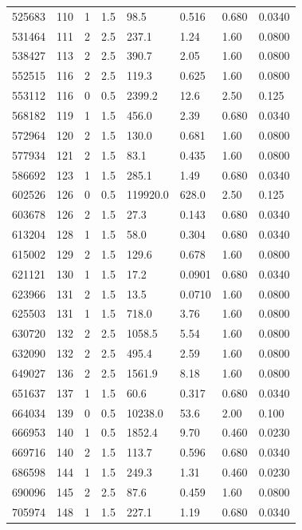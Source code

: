 \documentclass[preview]{standalone}
\begin{document}
{{{\begin{tabular}{L{1.2cm}C{1.2cm} C{0.3cm}C{0.5cm} C{1.4cm}C{1.4cm} C{1.4cm}C{1.4cm}}
  525683  &   110  & 1     & 1.5 &  98.5  & 0.516  & 0.680 &  0.0340   \\ 
  531464  &   111  & 2     & 2.5 &  237.1  & 1.24  & 1.60 &  0.0800   \\ 
  538427  &   113  & 2     & 2.5 &  390.7  & 2.05  & 1.60 &  0.0800   \\ 
  552515  &   116  & 2     & 2.5 &  119.3  & 0.625  & 1.60 &  0.0800   \\ 
  553112  &   116  & 0     & 0.5 &  2399.2  & 12.6  & 2.50 &  0.125   \\ 
  568182  &   119  & 1     & 1.5 &  456.0  & 2.39  & 0.680 &  0.0340   \\ 
  572964  &   120  & 2     & 1.5 &  130.0  & 0.681  & 1.60 &  0.0800   \\ 
  577934  &   121  & 2     & 1.5 &  83.1  & 0.435  & 1.60 &  0.0800   \\ 
  586692  &   123  & 1     & 1.5 &  285.1  & 1.49  & 0.680 &  0.0340   \\ 
  602526  &   126  & 0     & 0.5 &  119920.0  & 628.0  & 2.50 &  0.125   \\ 
  603678  &   126  & 2     & 1.5 &  27.3  & 0.143  & 0.680 &  0.0340   \\ 
  613204  &   128  & 1     & 1.5 &  58.0  & 0.304  & 0.680 &  0.0340   \\ 
  615002  &   129  & 2     & 1.5 &  129.6  & 0.678  & 1.60 &  0.0800   \\ 
  621121  &   130  & 1     & 1.5 &  17.2  & 0.0901  & 0.680 &  0.0340   \\ 
  623966  &   131  & 2     & 1.5 &  13.5  & 0.0710  & 1.60 &  0.0800   \\ 
  625503  &   131  & 1     & 1.5 &  718.0  & 3.76  & 1.60 &  0.0800   \\ 
  630720  &   132  & 2     & 2.5 &  1058.5  & 5.54  & 1.60 &  0.0800   \\ 
  632090  &   132  & 2     & 2.5 &  495.4  & 2.59  & 1.60 &  0.0800   \\ 
  649027  &   136  & 2     & 2.5 &  1561.9  & 8.18  & 1.60 &  0.0800   \\ 
  651637  &   137  & 1     & 1.5 &  60.6  & 0.317  & 0.680 &  0.0340   \\ 
  664034  &   139  & 0     & 0.5 &  10238.0  & 53.6  & 2.00 &  0.100   \\ 
  666953  &   140  & 1     & 0.5 &  1852.4  & 9.70  & 0.460 &  0.0230   \\ 
  669716  &   140  & 2     & 1.5 &  113.7  & 0.596  & 0.680 &  0.0340   \\ 
  686598  &   144  & 1     & 1.5 &  249.3  & 1.31  & 0.460 &  0.0230   \\ 
  690096  &   145  & 2     & 2.5 &  87.6  & 0.459  & 1.60 &  0.0800   \\ 
  705974  &   148  & 1     & 1.5 &  227.1  & 1.19  & 0.680 &  0.0340   \\ 
\hline 
\end{tabular} 

}}}
\end{document}

